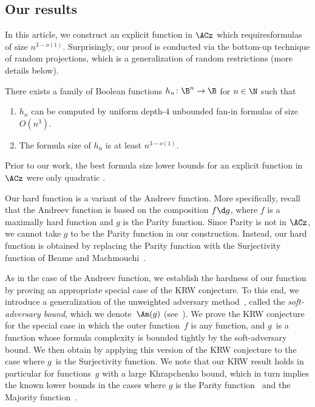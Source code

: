 \documentclass{toc}
\begin{document}
\subsection{Our results}

In this %
article,  %
we construct an explicit function in $\ACz$ which requiresformulas of size $n^{3-o(1)}$. Surprisingly, our proof
is conducted via the bottom-up technique of random projections, which
is a generalization of random restrictions (more details below).
\begin{theorem}
\label{thm:main}There exists a family of Boolean functions $h_{n}\colon\B^{n}\to\B$
for $n\in\N$ such that 
\begin{enumerate}
\item $h_{n}$ can be computed by uniform depth-$4$ unbounded fan-in formulas
of size $O(n^{3})$. 
\item The formula size of $h_{n}$ is at least $n^{3-o(1)}$.
\end{enumerate}
\end{theorem}

Prior to our work, the best formula size lower bounds
%
for  %
an explicit
function in $\ACz$ were only quadratic \cite{N66,CKK12,JuknaBook,BM12}.

Our hard function is a variant of the Andreev function. More specifically,
recall that the Andreev function is based on the composition $f\d g$,
where $f$ is a maximally hard function and $g$ is the Parity function.
Since Parity is not in $\ACz$, we cannot take $g$ to be the Parity
function in our construction. Instead, our hard function is obtained
by replacing the Parity function with the Surjectivity function of Beame and Machmouchi~\cite{BM12}.

As in the case of the Andreev function, we establish the hardness
of our function by proving an appropriate special case of the KRW
conjecture. To this end, we introduce a generalization of the unweighted
%
adversary method~\cite{A02}, called the \emph{soft-adversary bound}, which we
denote~$\Am(g)$ (see~). We prove the KRW
conjecture for the special case in which the outer function~$f$
is any function, and $g$~is a function whose formula complexity
is bounded tightly by the soft-adversary bound. We then obtain 
by applying this version of the KRW conjecture to the case where $g$~is
the Surjectivity function. We note that our KRW result holds in particular
for functions~$g$ with a large Khrapchenko bound, which in turn
implies the known lower bounds in the cases where $g$ is the Parity
function~\cite{H98} and the Majority function~\cite{GTN19}.
\end{document}
